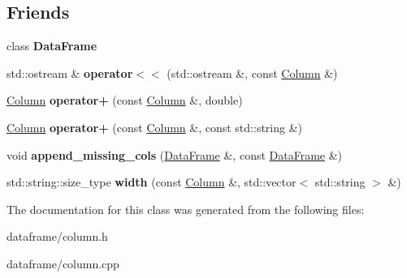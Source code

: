 \subsection*{Friends}
\begin{DoxyCompactItemize}
\item 
\mbox{\label{classColumn_ac3cf826bc43b8ab4740915b5c60e7166}} 
class {\bfseries Data\+Frame}
\item 
\mbox{\label{classColumn_a5095863e070821f0cca491aa6c11a685}} 
std\+::ostream \& {\bfseries operator$<$$<$} (std\+::ostream \&, const \hyperlink{classColumn}{Column} \&)
\item 
\mbox{\label{classColumn_a0073d63e1317b7b2bad1c4daa275b0ba}} 
\hyperlink{classColumn}{Column} {\bfseries operator+} (const \hyperlink{classColumn}{Column} \&, double)
\item 
\mbox{\label{classColumn_a07ec03095bd9fec0ccdccafcadef8ea2}} 
\hyperlink{classColumn}{Column} {\bfseries operator+} (const \hyperlink{classColumn}{Column} \&, const std\+::string \&)
\item 
\mbox{\label{classColumn_a27cc8acd51a5cd40e6a2726368914661}} 
void {\bfseries append\+\_\+missing\+\_\+cols} (\hyperlink{classDataFrame}{Data\+Frame} \&, const \hyperlink{classDataFrame}{Data\+Frame} \&)
\item 
\mbox{\label{classColumn_acbe8416c515df226506ae71d8c6fd05a}} 
std\+::string\+::size\+\_\+type {\bfseries width} (const \hyperlink{classColumn}{Column} \&, std\+::vector$<$ std\+::string $>$ \&)
\end{DoxyCompactItemize}


The documentation for this class was generated from the following files\+:\begin{DoxyCompactItemize}
\item 
dataframe/column.\+h\item 
dataframe/column.\+cpp\end{DoxyCompactItemize}

